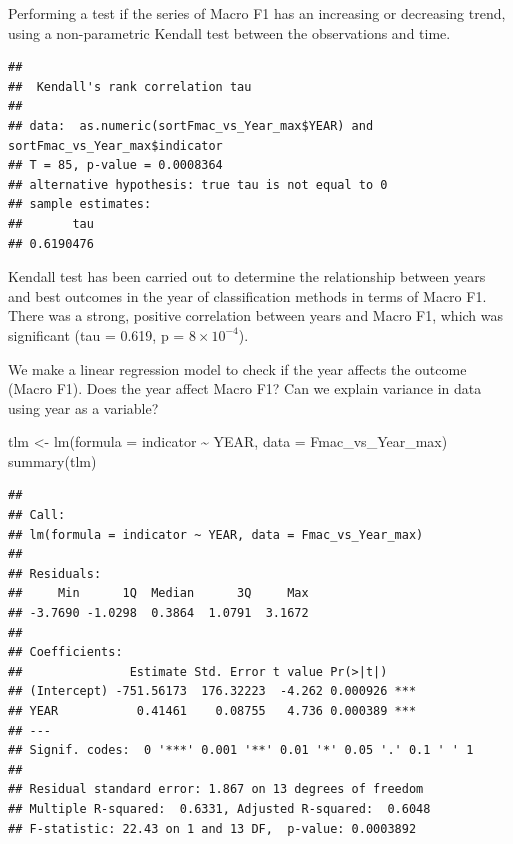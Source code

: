 \documentclass[
]{article}
\newenvironment{Shaded}{\begin{snugshade}}{\end{snugshade}}
\newcommand{\AttributeTok}[1]{\textcolor[rgb]{0.77,0.63,0.00}{#1}}
\newcommand{\FunctionTok}[1]{\textcolor[rgb]{0.00,0.00,0.00}{#1}}
\newcommand{\NormalTok}[1]{#1}
\newcommand{\OtherTok}[1]{\textcolor[rgb]{0.56,0.35,0.01}{#1}}
\newcommand{\SpecialCharTok}[1]{\textcolor[rgb]{0.00,0.00,0.00}{#1}}
\newcommand{\StringTok}[1]{\textcolor[rgb]{0.31,0.60,0.02}{#1}}
\begin{document}
Performing a test if the series of Macro F1 has an increasing or decreasing trend, using a non-parametric Kendall test between the observations and time.

\begin{Shaded}
\end{Shaded}

\begin{verbatim}
## 
##  Kendall's rank correlation tau
## 
## data:  as.numeric(sortFmac_vs_Year_max$YEAR) and sortFmac_vs_Year_max$indicator
## T = 85, p-value = 0.0008364
## alternative hypothesis: true tau is not equal to 0
## sample estimates:
##       tau 
## 0.6190476
\end{verbatim}

Kendall test has been carried out to determine the relationship between years and best outcomes in the year of classification methods in terms of Macro F1. There was a strong, positive correlation between years and Macro F1, which was significant (tau = 0.619, p = \ensuremath{8\times 10^{-4}}).

We make a linear regression model to check if the year affects the outcome (Macro F1). Does the year affect Macro F1? Can we explain variance in data using year as a variable?

\begin{Shaded}
\begin{Highlighting}[]
\NormalTok{tlm }\OtherTok{\textless{}{-}} \FunctionTok{lm}\NormalTok{(}\AttributeTok{formula =}\NormalTok{ indicator }\SpecialCharTok{\textasciitilde{}}\NormalTok{ YEAR, }\AttributeTok{data =}\NormalTok{ Fmac\_vs\_Year\_max)}
\FunctionTok{summary}\NormalTok{(tlm)}
\end{Highlighting}
\end{Shaded}

\begin{verbatim}
## 
## Call:
## lm(formula = indicator ~ YEAR, data = Fmac_vs_Year_max)
## 
## Residuals:
##     Min      1Q  Median      3Q     Max 
## -3.7690 -1.0298  0.3864  1.0791  3.1672 
## 
## Coefficients:
##               Estimate Std. Error t value Pr(>|t|)    
## (Intercept) -751.56173  176.32223  -4.262 0.000926 ***
## YEAR           0.41461    0.08755   4.736 0.000389 ***
## ---
## Signif. codes:  0 '***' 0.001 '**' 0.01 '*' 0.05 '.' 0.1 ' ' 1
## 
## Residual standard error: 1.867 on 13 degrees of freedom
## Multiple R-squared:  0.6331, Adjusted R-squared:  0.6048 
## F-statistic: 22.43 on 1 and 13 DF,  p-value: 0.0003892
\end{verbatim}
\end{document}
